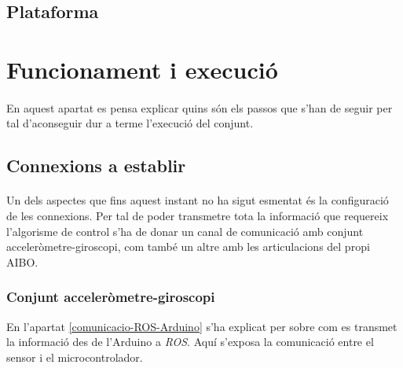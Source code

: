 \documentclass[12pt,a4paper,final,twoside]{article}
\begin{document}

\subsection{Plataforma}

\section{Funcionament i execució}

\paragraph{}En aquest apartat es pensa explicar quins són els passos que s'han de seguir per tal d'aconseguir dur a terme l'execució del conjunt.

\subsection{Connexions a establir}

\paragraph{}Un dels aspectes que fins aquest instant no ha sigut esmentat és la configuració de les connexions. Per tal de poder transmetre tota la informació que requereix l'algorisme de control s'ha de donar un canal de comunicació amb conjunt acceleròmetre-giroscopi, com també un altre amb les articulacions del propi AIBO.

\subsubsection{Conjunt acceleròmetre-giroscopi}

En l'apartat \ref{comunicacio-ROS-Arduino} s'ha explicat per sobre com es transmet la informació des de l'Arduino a \textit{ROS}. Aquí s'exposa la comunicació entre el sensor i el microcontrolador. 
\end{document}
